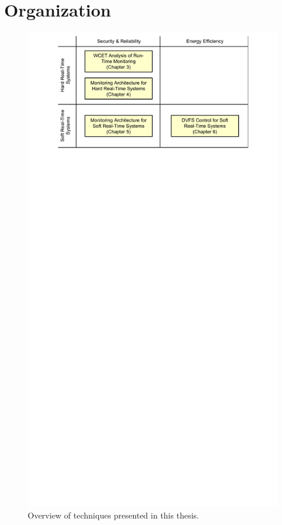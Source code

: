 \section{Organization}

\begin{figure}
  \begin{center}
    \includegraphics{figs/thesis_overview.pdf}
    \caption{Overview of techniques presented in this thesis.}
    \label{fig:intro.thesis_overview}
  \end{center}
\end{figure}



